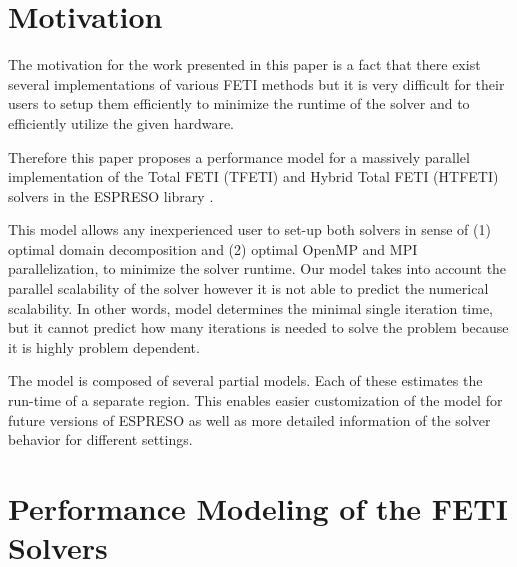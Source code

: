 \documentclass[runningheads,a4paper]{llncs}
\begin{document}
\section{Motivation}
The motivation for the work presented in this paper is a fact that there exist several 
implementations of various FETI methods but it is very difficult for their users to 
setup them efficiently to minimize the runtime of the solver and to efficiently utilize the 
given hardware. 

Therefore this paper proposes a performance model for a massively parallel implementation of 
the Total FETI (TFETI) and Hybrid Total FETI (HTFETI) solvers in the 
ESPRESO library \cite{vriha2016massively}.


This model allows any inexperienced user to set-up both solvers in sense of 
(1) optimal domain decomposition and 
(2) optimal OpenMP and MPI parallelization, 
to minimize the solver runtime. 
Our model takes into account the parallel scalability of the solver however 
it is not able to predict the numerical scalability. In other words, model determines the minimal single iteration time, but it cannot predict how many iterations is needed 
to solve the problem because it is highly problem dependent.  


The model is composed of several partial models. Each of these estimates the run-time of a separate region. This enables easier customization of the model for future 
versions of ESPRESO as well as more detailed information of the solver behavior for 
different settings. 




%

\section{Performance Modeling of the FETI Solvers }






{\renewcommand{\markboth}[2]{}%
\printbibliography[heading=bibintoc]}
%
%

\appendix


\end{document}
